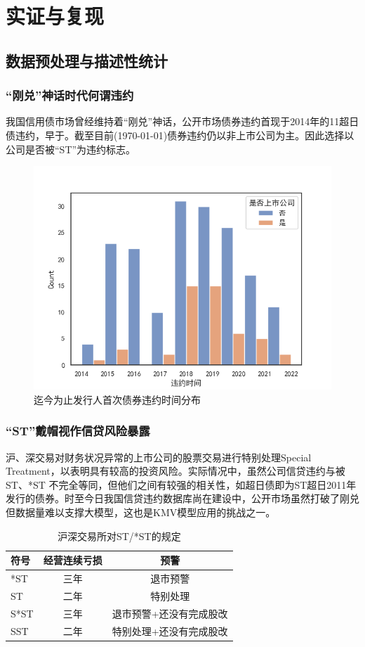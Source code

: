 \documentclass{ctexbeamer}
\begin{document}
\section{实证与复现}
\subsection{数据预处理与描述性统计}
\begin{frame}
    \frametitle{“刚兑”神话时代何谓违约}
    我国信用债市场曾经维持着“刚兑”神话，公开市场债券违约首现于2014年的11超日债违约，早于\citet{彭伟2012基于}。截至目前(\today)债券违约仍以非上市公司为主。因此\citet{彭伟2012基于}选择以公司是否被“ST”为违约标志。
    \begin{figure}[H]
        \centering
        \includegraphics[width=0.6\linewidth]{img/发行人首次债券违约.png}
        \caption{迄今为止发行人首次债券违约时间分布}\label{fig:default}
    \end{figure}
\end{frame}
\begin{frame}
    \frametitle{“ST”戴帽视作信贷风险暴露}
    沪、深交易对财务状况异常的上市公司的股票交易进行特别处理Special Treatment，以表明具有较高的投资风险。实际情况中，虽然公司信贷违约与被 ST、*ST 不完全等同，但他们之间有较强的相关性，如超日债即为ST超日2011年发行的债券。时至今日我国信贷违约数据库尚在建设中，公开市场虽然打破了刚兑但数据量难以支撑大模型，这也是KMV模型应用的挑战之一。
    \begin{table}
        \centering
        \begin{tabular}{lcc}
            \toprule
            符号   & 经营连续亏损 & 预警           \\
            \midrule
            *ST  & 三年     & 退市预警         \\
            ST   & 二年     & 特别处理         \\
            S*ST & 三年     & 退市预警+还没有完成股改 \\
            SST  & 二年     & 特别处理+还没有完成股改 \\
            \bottomrule
        \end{tabular}
        \caption{沪深交易所对ST/*ST的规定}
    \end{table}
\end{frame}
\end{document}
